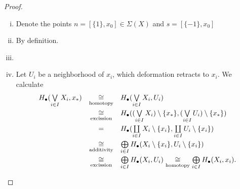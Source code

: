 	\begin{proof}
		\begin{enumerate}[(i)]
			\item{
				Denote the points $n = [\{1\},x_0] \in \Sigma(X)$ and $s = [\{-1\},x_0]$
			}
			\item{
				By definition.
			}
			\item{

			}
			\item{
				Let $U_i$ be a neighborhood of $x_i$, which deformation retracts to $x_i$. We calculate
				\begin{equation*}
					\begin{array}{rcl}
						H_\bullet(\operatorname*{\bigvee} \limits_{i \in I}X_i,x_{*}) &\underset{\text{homotopy}}{\cong}& H_\bullet(\operatorname*{\bigvee} \limits_{i \in I} X_i, U_i)\\[1em]
						&\underset{\text{excission}}{\cong}& H_\bullet((\operatorname*{\bigvee} \limits_{i \in I}X_i)\setminus\{x_{*}\},(\operatorname*{\bigvee} \limits_{i \in I} U_i) \setminus \{x_{*}\})\\[1em]
						&=& H_\bullet(\coprod \limits_{i \in I}X_i \setminus\{x_i\},\coprod \limits_{i \in I}U_i \setminus\{x_i\})\\[1em]
						&\underset{\text{additivity}}{\cong}& \bigoplus \limits_{i \in I}H_\bullet(X_i \setminus \{x_i\}, U_i \setminus \{x_i\})\\[1em]
						&\underset{\text{excission}}{\cong}& \bigoplus \limits_{i \in I}H_\bullet(X_i, U_i) \underset{\text{homotopy}}{\cong} \bigoplus \limits_{i \in I} H_\bullet(X_i,x_i).
					\end{array}
				\end{equation*}
			}
		\end{enumerate}
	\end{proof}

